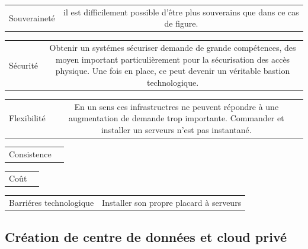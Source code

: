 \documentclass[11pt, a4paper ]{article}
\begin{document}
\begin{spacing}{1.5}
\begin{center}
	\begin{tabular}{| l | c | }
		Souveraineté & il est difficilement possible d'être plus souverains que dans ce cas de figure. \\
	\end{tabular}
	\begin{tabular}{| l | c | }
		Sécurité & Obtenir un systémes sécuriser demande de grande compétences, des moyen important particulièrement pour la sécurisation des accès physique. Une fois en place, ce peut devenir un véritable bastion technologique.\\
	\end{tabular}
	\begin{tabular}{| l | c | }
		Flexibilité & En un sens ces infrastructres ne peuvent répondre à une augmentation de demande trop importante. Commander et installer un serveurs n'est pas instantané. \\
	\end{tabular}
	\begin{tabular}{| l | c | }
		Consistence & \\
	\end{tabular}
	\begin{tabular}{| l | c | }
		Coût & \\
	\end{tabular}
	\begin{tabular}{| l | c | }
		Barriéres technologique & Installer son propre placard à serveurs \\
	\end{tabular}
\end{center}

			\subsection{Création de centre de données et cloud privé}







\end{spacing}
\end{document}
